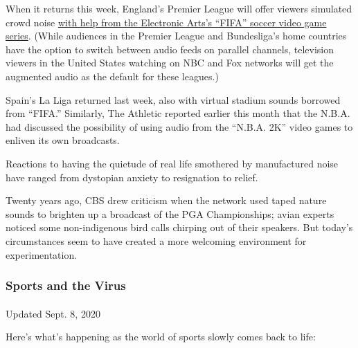 When it returns this week, England's Premier League will offer viewers
simulated crowd noise
\href{https://www.skysports.com/football/news/11661/12004035/crowd-noise-available-for-sky-sports-premier-league-games-how-it-works}{with
help from the Electronic Arts's ``FIFA'' soccer video game series}.
(While audiences in the Premier League and Bundesliga's home countries
have the option to switch between audio feeds on parallel channels,
television viewers in the United States watching on NBC and Fox networks
will get the augmented audio as the default for these leagues.)

Spain's La Liga returned last week, also with virtual stadium sounds
borrowed from ``FIFA.'' Similarly, The Athletic reported earlier this
month that the N.B.A. had discussed the possibility of using audio from
the ``N.B.A. 2K'' video games to enliven its own broadcasts.

Reactions to having the quietude of real life smothered by manufactured
noise have ranged from dystopian anxiety to resignation to relief.

Twenty years ago, CBS drew criticism when the network used taped nature
sounds to brighten up a broadcast of the PGA Championships; avian
experts noticed some non-indigenous bird calls chirping out of their
speakers. But today's circumstances seem to have created a more
welcoming environment for experimentation.

\hypertarget{sports-and-the-virus}{%
\subsubsection{Sports and the Virus}\label{sports-and-the-virus}}

\paragraph{}

Updated Sept. 8, 2020

Here's what's happening as the world of sports slowly comes back to
life:

